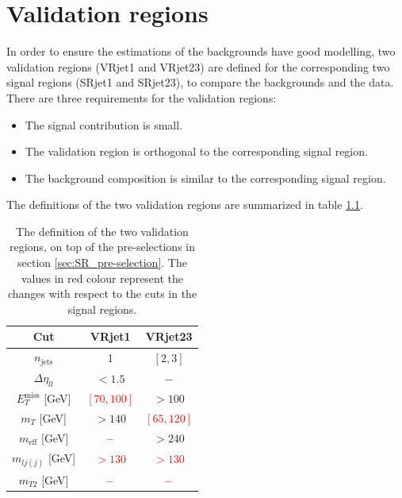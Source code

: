 \chapter{Validation regions}
\label{ch:VR}

In order to ensure the estimations of the backgrounds have good modelling, two validation regions (VRjet1 and VRjet23) are defined for the corresponding two signal regions (SRjet1 and SRjet23), to compare the backgrounds and the data.
There are three requirements for the validation regions:
\begin{itemize}
\item The signal contribution is small.
\item The validation region is orthogonal to the corresponding signal region.
\item The background composition is similar to the corresponding signal region.
\end{itemize}
The definitions of the two validation regions are summarized in table \ref{tab:VR_cuts}.

\begin{table}[htbp]
\begin{center}
\begin{tabular}{|c|c|c|}
\hline
Cut & VRjet1 & VRjet23 \\
\hline
\hline
$n_{\text{jets}}$               & 1                             & $[2,3]$ \\
$\Delta \eta_{ll}$              & $<1.5$                        & $-$ \\
$E_T^{\text{miss}}$ [GeV]       & \textcolor{red}{ $[70,100]$ } & $>100$ \\
$m_T$ [GeV]                     & $>140$                        & \textcolor{red}{$[65,120]$} \\
$m_{\text{eff}}$ [GeV]          & $\textcolor{red}{-}$          & $>240$ \\
$m_{lj(j)}$ [GeV]               & \textcolor{red}{$>130$}       & \textcolor{red}{$>130$} \\
$m_{T2}$ [GeV]                  & $\textcolor{red}{-}$          & $\textcolor{red}{-}$ \\
\hline
\end{tabular}
\caption{The definition of the two validation regions, on top of the pre-selections in section \ref{sec:SR_pre-selection}. The values in red colour represent the changes with respect to the cuts in the signal regions.}
\label{tab:VR_cuts}
\end{center}
\end{table}

